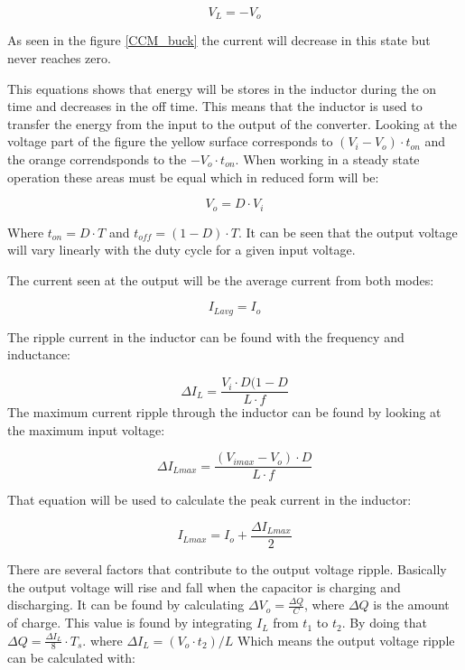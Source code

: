 \begin{equation}
V_L = -V_o
\end{equation} 

As seen in the figure \ref{CCM_buck} the current will decrease in this state but never reaches zero.

This equations shows that energy will be stores in the inductor during the on time and decreases in the off time. This means that the inductor is used to transfer the energy from the input to the output of the converter. 
Looking at the voltage part of the figure the yellow surface corresponds to $(V_i-V_o)\cdot t_{on}$ and the orange correndsponds to the $-V_o\cdot t_{on}$. When working in a steady state operation these areas must be equal which in reduced form will be:

\begin{equation}
V_o = D\cdot V_i
\end{equation}

Where $t_{on}=D\cdot T$ and $t_{off}=(1-D)\cdot T$. It can be seen that the output voltage will vary linearly with the duty cycle for a given input voltage.

The current seen at the output will be the average current from both modes:

\begin{equation} \label{Iavg}
I_{Lavg}=I_o
\end{equation}

The ripple current in the inductor can be found with the frequency and inductance:

\begin{equation}\label{buckind}
\Delta I_L = \frac{V_i\cdot D(1-D}{L\cdot f}
\end{equation}
The maximum current ripple through the inductor can be found by looking at the maximum input voltage:

\begin{equation}
\Delta I_{Lmax} = \frac{(V_{imax}-V_{o})\cdot D}{L\cdot f}
\end{equation}

That equation will be used to calculate the peak current in the inductor:

\begin{equation}
I_{Lmax} = I_o + \frac{\Delta I_{Lmax}}{2}
\end{equation}

There are several factors that contribute to the output voltage ripple. Basically the output voltage will rise and fall when the capacitor is charging and discharging. It can be found by calculating $\Delta V_o = \frac{\Delta Q}{C}$, where $\Delta Q$ is the amount of charge. This value is found by integrating $I_L$ from $t_1$ to $t_2$. By doing that $\Delta Q = \frac{\Delta I_L}{8}\cdot T_s$. where $\Delta I_L = (V_o\cdot t_2)/L$ Which means the output voltage ripple can be calculated with:
 
